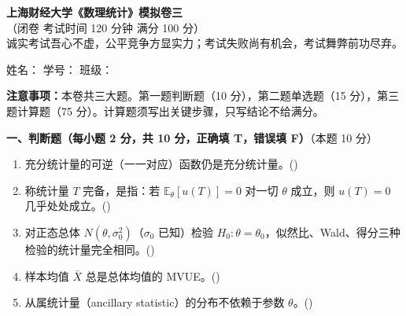 \documentclass[12pt,a4paper]{ctexart}
\newcommand{\question}[2]{\bigskip\noindent\textbf{#1}\quad（本题 #2 分）\par\nobreak\medskip}
\newcommand{\E}{\mathbb{E}}
\begin{document}
\begin{center}
  {\LARGE\bfseries 上海财经大学《数理统计》模拟卷三}\\[2mm]
  {\small（闭卷 \quad 考试时间 120 分钟 \quad 满分 100 分）}\\[1mm]
  {\small 诚实考试吾心不虚，公平竞争方显实力；考试失败尚有机会，考试舞弊前功尽弃。}
\end{center}

\vspace{2mm}
\noindent
姓名：\underline{\hspace{3.0cm}}\hfill
学号：\underline{\hspace{3.0cm}}\hfill
班级：\underline{\hspace{3.0cm}}



\vspace{1mm}
\noindent\textbf{注意事项：}本卷共三大题。第一题判断题（10 分），第二题单选题（15 分），第三题计算题（75 分）。计算题须写出关键步骤，只写结论不给满分。

\question{一、判断题（每小题 2 分，共 10 分，正确填 T，错误填 F）}{10}
\begin{enumerate}[label=\arabic*.,leftmargin=2.0em]
  \item 充分统计量的可逆（一一对应）函数仍是充分统计量。\hfill(\underline{\hspace{1.2cm}})
  \item 称统计量 $T$ 完备，是指：若 $\E_\theta[u(T)]=0$ 对一切 $\theta$ 成立，则 $u(T)=0$ 几乎处处成立。\hfill(\underline{\hspace{1.2cm}})
  \item 对正态总体 $N(\theta,\sigma_0^2)$（$\sigma_0$ 已知）检验 $H_0:\theta=\theta_0$，似然比、Wald、得分三种检验的统计量完全相同。\hfill(\underline{\hspace{1.2cm}})
  \item 样本均值 $\bar X$ 总是总体均值的 MVUE。\hfill(\underline{\hspace{1.2cm}})
  \item 从属统计量（ancillary statistic）的分布不依赖于参数 $\theta$。\hfill(\underline{\hspace{1.2cm}})
\end{enumerate}
\end{document}
